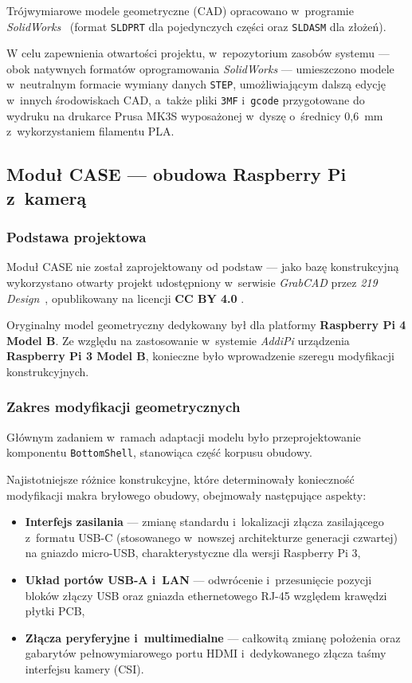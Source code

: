 \documentclass[a4paper,12pt,reqno]{article}
\begin{document}
Trójwymiarowe modele geometryczne (CAD) opracowano w~programie \textit{SolidWorks}~\cite{solidworks} (format \texttt{SLDPRT} dla pojedynczych części oraz \texttt{SLDASM} dla złożeń).

W celu zapewnienia otwartości projektu, w~repozytorium zasobów systemu --- obok natywnych formatów oprogramowania \textit{SolidWorks} --- umieszczono modele w~neutralnym formacie wymiany danych \texttt{STEP}, umożliwiającym dalszą edycję w~innych środowiskach CAD, a~także pliki \texttt{3MF} i~\texttt{gcode} przygotowane do wydruku na drukarce Prusa MK3S wyposażonej w~dyszę o~średnicy 0{,}6~mm z~wykorzystaniem filamentu PLA.

\subsection{Moduł CASE --- obudowa Raspberry Pi z~kamerą}

\subsubsection{Podstawa projektowa}

Moduł CASE nie został zaprojektowany od podstaw --- jako bazę konstrukcyjną wykorzystano otwarty projekt udostępniony w~serwisie \textit{GrabCAD} przez \textit{219 Design}~\cite{grabcad219}, opublikowany na licencji \textbf{CC BY 4.0} \cite{cc4}.

Oryginalny model geometryczny dedykowany był dla platformy \textbf{Raspberry Pi 4 Model B}. Ze względu na zastosowanie w~systemie \textit{AddiPi} urządzenia \textbf{Raspberry Pi 3 Model B}, konieczne było wprowadzenie szeregu modyfikacji konstrukcyjnych.

\subsubsection{Zakres modyfikacji geometrycznych}

Głównym zadaniem w~ramach adaptacji modelu było przeprojektowanie komponentu \texttt{BottomShell}, stanowiąca część korpusu obudowy.

Najistotniejsze różnice konstrukcyjne, które determinowały konieczność modyfikacji makra bryłowego obudowy, obejmowały następujące aspekty:
\begin{itemize}
	\item \textbf{Interfejs zasilania} --- zmianę standardu i~lokalizacji złącza zasilającego z~formatu USB-C (stosowanego w~nowszej architekturze generacji czwartej) na gniazdo micro-USB, charakterystyczne dla wersji Raspberry Pi 3,
	\item \textbf{Układ portów USB-A i~LAN} --- odwrócenie i~przesunięcie pozycji bloków złączy USB oraz gniazda ethernetowego RJ-45 względem krawędzi płytki PCB,
	\item \textbf{Złącza peryferyjne i~multimedialne} --- całkowitą zmianę położenia oraz gabarytów pełnowymiarowego portu HDMI i~dedykowanego złącza taśmy interfejsu kamery (CSI).
\end{itemize}
\end{document}
